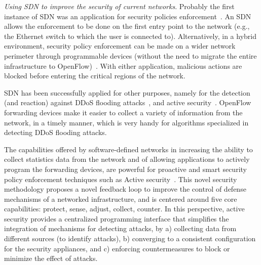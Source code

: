 \noindent \textit{Using SDN to improve the security of current networks}.
Probably the first instance of SDN was an application for security policies enforcement~\cite{casado2006}. 
An SDN allows the enforcement to be done on the first entry point to the network (e.g., the Ethernet switch to which the user is connected to). 
Alternatively, in a hybrid environment, security policy enforcement can be made on a wider network perimeter through programmable devices (without the need to migrate the entire infrastructure to OpenFlow)~\cite{wang2012-1}.
With either application, malicious actions are blocked before entering the critical regions of the network.

SDN has been successfully applied for other purposes, namely for the detection (and reaction) against DDoS flooding attacks~\cite{braga2010-1}, and active security~\cite{hand2013}.
OpenFlow forwarding devices make it easier to collect a variety of information from the network, in a timely 
manner, which is very handy for algorithms specialized in detecting DDoS flooding attacks.

The capabilities offered by software-defined networks in increasing the ability to collect statistics data from the network and of allowing applications to actively program the forwarding devices, are powerful for proactive and smart 
security policy enforcement techniques such as Active security~\cite{hand2013}.
This novel security methodology proposes a novel feedback loop to improve the control of defense mechanisms 
of a networked infrastructure, and is centered around five core capabilities: protect, sense, 
adjust, collect, counter.
In this perspective, active security provides a centralized programming interface that simplifies the integration of mechanisms for detecting attacks, by
a) collecting data from different sources (to identify attacks), 
b) converging to a consistent configuration for the security appliances, and 
c) enforcing countermeasures to block or minimize the effect of attacks.

%

